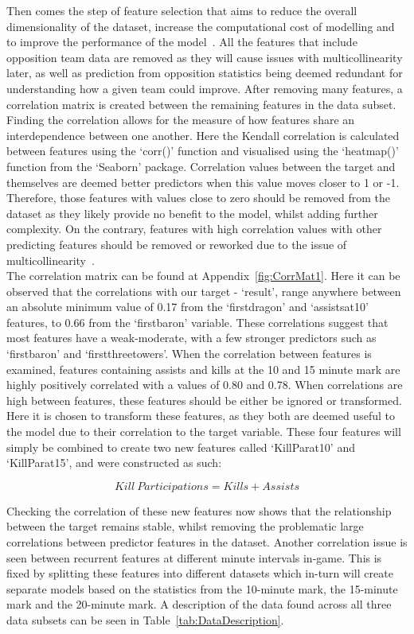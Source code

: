 Then comes the step of feature selection that aims to reduce the overall dimensionality of the dataset, increase the computational cost of modelling and to improve the performance of the model~\citep{brownlee2019choose}.
All the features that include opposition team data are removed as they will cause issues with multicollinearity later, as well as prediction from opposition statistics being deemed redundant for understanding how a given team could improve.
After removing many features, a correlation matrix is created between the remaining features in the data subset.
Finding the correlation allows for the measure of how features share an interdependence between one another.
Here the Kendall correlation is calculated between features using the `corr()' function and visualised using the `heatmap()' function from the `Seaborn' package.
Correlation values between the target and themselves are deemed better predictors when this value moves closer to 1 or -1.
Therefore, those features with values close to zero should be removed from the dataset as they likely provide no benefit to the model, whilst adding further complexity.
On the contrary, features with high correlation values with other predicting features should be removed or reworked due to the issue of multicollinearity~\citep{alin2010multicollinearity}. \\

The correlation matrix can be found at Appendix~\ref{fig:CorrMat1}.
Here it can be observed that the correlations with our target - `result', range anywhere between an absolute minimum value of 0.17 from the `firstdragon' and `assistsat10' features, to 0.66 from the `firstbaron' variable.
These correlations suggest that most features have a weak-moderate, with a few stronger predictors such as `firstbaron' and `firstthreetowers'.
When the correlation between features is examined, features containing assists and kills at the 10 and 15 minute mark are highly positively correlated with a values of 0.80 and 0.78.
When correlations are high between features, these features should be either be ignored or transformed.
Here it is chosen to transform these features, as they both are deemed useful to the model due to their correlation to the target variable.
These four features will simply be combined to create two new features called `KillParat10' and `KillParat15', and were constructed as such:

\[ Kill \: Participations = Kills + Assists \]

Checking the correlation of these new features now shows that the relationship between the target remains stable, whilst removing the problematic large correlations between predictor features in the dataset.
Another correlation issue is seen between recurrent features at different minute intervals in-game.
This is fixed by splitting these features into different datasets which in-turn will create separate models based on the statistics from the 10-minute mark, the 15-minute mark and the 20-minute mark.
A description of the data found across all three data subsets can be seen in Table~\ref{tab:DataDescription}. \\

